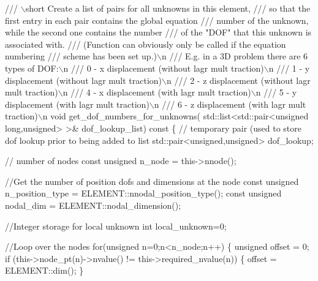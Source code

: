 \begin{DoxyCodeInclude}
 \textcolor{comment}{}
\textcolor{comment}{ /// \(\backslash\)short Create a list of pairs for all unknowns in this element,}
\textcolor{comment}{ /// so that the first entry in each pair contains the global equation}
\textcolor{comment}{ /// number of the unknown, while the second one contains the number}
\textcolor{comment}{ /// of the "DOF" that this unknown is associated with.}
\textcolor{comment}{ /// (Function can obviously only be called if the equation numbering}
\textcolor{comment}{ /// scheme has been set up.)\(\backslash\)n}
\textcolor{comment}{ /// E.g. in a 3D problem there are 6 types of DOF:\(\backslash\)n}
\textcolor{comment}{ /// 0 - x displacement (without lagr mult traction)\(\backslash\)n}
\textcolor{comment}{ /// 1 - y displacement (without lagr mult traction)\(\backslash\)n}
\textcolor{comment}{ /// 2 - z displacement (without lagr mult traction)\(\backslash\)n}
\textcolor{comment}{ /// 4 - x displacement (with lagr mult traction)\(\backslash\)n}
\textcolor{comment}{ /// 5 - y displacement (with lagr mult traction)\(\backslash\)n}
\textcolor{comment}{ /// 6 - z displacement (with lagr mult traction)\(\backslash\)n}
\textcolor{comment}{} \textcolor{keywordtype}{void} get\_dof\_numbers\_for\_unknowns(
    std::list<std::pair<unsigned long,unsigned> >& dof\_lookup\_list)\textcolor{keyword}{ const}
\textcolor{keyword}{  }\{
   \textcolor{comment}{// temporary pair (used to store dof lookup prior to being added to list}
   std::pair<unsigned,unsigned> dof\_lookup;
   
   \textcolor{comment}{// number of nodes}
   \textcolor{keyword}{const} \textcolor{keywordtype}{unsigned} n\_node = this->nnode();
   
   \textcolor{comment}{//Get the number of position dofs and dimensions at the node}
   \textcolor{keyword}{const} \textcolor{keywordtype}{unsigned} n\_position\_type = ELEMENT::nnodal\_position\_type();
   \textcolor{keyword}{const} \textcolor{keywordtype}{unsigned} nodal\_dim = ELEMENT::nodal\_dimension();
   
   \textcolor{comment}{//Integer storage for local unknown}
   \textcolor{keywordtype}{int} local\_unknown=0;
   
   \textcolor{comment}{//Loop over the nodes}
   \textcolor{keywordflow}{for}(\textcolor{keywordtype}{unsigned} n=0;n<n\_node;n++)
    \{
     \textcolor{keywordtype}{unsigned} offset = 0;
     \textcolor{keywordflow}{if} (this->node\_pt(n)->nvalue() != this->required\_nvalue(n))
      \{
       offset = ELEMENT::dim();
      \}
     

\end{DoxyCodeInclude}
